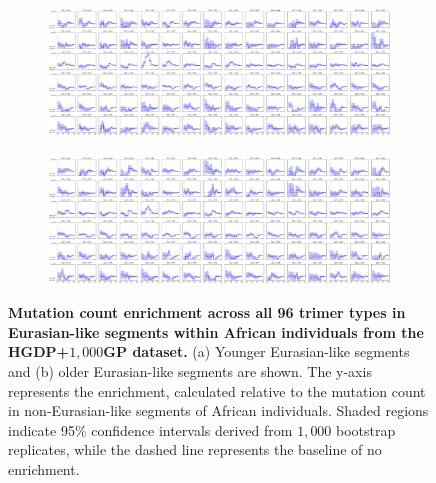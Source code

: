 \begin{figure}
    \centering
    \begin{subfigure}[b]{\textwidth}
        \centering
        \includegraphics[width=\textwidth]{figures/gb_bta/mutrates_output_bta_young_afr.pdf}
        \caption{}
        \label{fig:gb-mutational-bta-young}
    \end{subfigure}
    
    \begin{subfigure}[b]{\textwidth}
        \centering
        \includegraphics[width=\textwidth]{figures/gb_bta/mutrates_output_bta_old_afr.pdf}
        \caption{}
        \label{fig:gb-mutational-bta-old}
    \end{subfigure}
    
    \caption{\textbf{Mutation count enrichment across all 96 trimer types in Eurasian-like segments within African individuals from the HGDP+$1{,}000$GP dataset.} (a) Younger Eurasian-like segments and (b) older Eurasian-like segments are shown. The y-axis represents the enrichment, calculated relative to the mutation count in non-Eurasian-like segments of African individuals. Shaded regions indicate 95\% confidence intervals derived from $1{,}000$ bootstrap replicates, while the dashed line represents the baseline of no enrichment.}
    \label{fig:gb-mutational-all-bta}
\end{figure}

